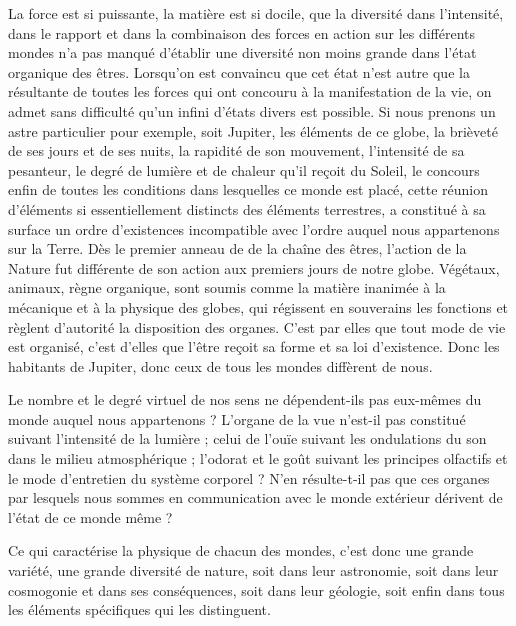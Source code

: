 \documentclass[a4paper, 11pt, oneside, landscape]{article}
\begin{document}
La force est si puissante, la matière est si docile, que la diversité dans l'intensité, dans le rapport et dans la combinaison des forces en action sur les différents mondes n'a pas manqué d'établir une diversité non moins grande dans l'état organique des êtres. Lorsqu'on est convaincu que cet état n'est autre que la résultante de toutes les forces qui ont concouru à la manifestation de la vie, on admet sans difficulté qu'un infini d'états divers est possible. Si nous prenons un astre particulier pour exemple, soit Jupiter, les éléments de ce globe, la brièveté de ses jours et de ses nuits, la rapidité de son mouvement, l'intensité de sa pesanteur, le degré de lumière et de chaleur qu'il reçoit du Soleil, le concours enfin de toutes les conditions dans lesquelles ce monde est placé, cette réunion d'éléments si essentiellement distincts des éléments terrestres, a constitué à sa surface un ordre d'existences incompatible avec l'ordre auquel nous appartenons sur la Terre. Dès le premier anneau de de la chaîne des êtres, l'action de la Nature fut différente de son action aux premiers jours de notre globe. Végétaux, animaux, règne organique, sont soumis comme la matière inanimée à la mécanique et à la physique des globes, qui régissent en souverains les fonctions et règlent d'autorité la disposition des organes. C'est par elles que tout mode de vie est organisé, c'est d'elles que l'être reçoit sa forme et sa loi d'existence. Donc les habitants de Jupiter, donc ceux de tous les mondes diffèrent de nous.

Le nombre et le degré virtuel de nos sens ne dépendent-ils pas eux-mêmes du monde auquel nous appartenons ? L'organe de la vue n'est-il pas constitué suivant l'intensité de la lumière ; celui de l'ouïe suivant les ondulations du son dans le milieu atmosphérique ; l'odorat et le goût suivant les principes olfactifs et le mode d'entretien du système corporel ? N'en résulte-t-il pas que ces organes par lesquels nous sommes en communication avec le monde extérieur dérivent de l'état de ce monde même ?

Ce qui caractérise la physique de chacun des mondes, c'est donc une grande variété, une grande diversité de nature, soit dans leur astronomie, soit dans leur cosmogonie et dans ses conséquences, soit dans leur géologie, soit enfin dans tous les éléments spécifiques qui les distinguent.
\end{document}
